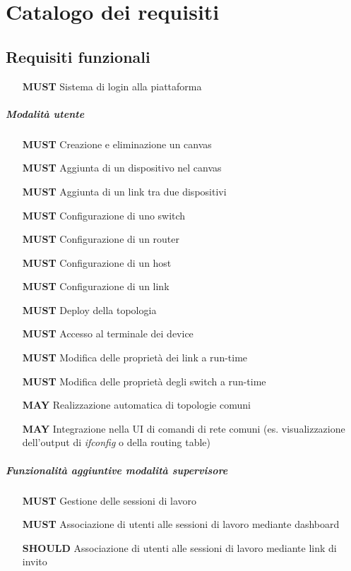 \documentclass[../main.tex]{subfiles}
\begin{document}
\chapter{Catalogo dei requisiti}
\section{Requisiti funzionali}

\begin{itemize}
    \item[\textbf{MUST}] Sistema di login alla piattaforma
\end{itemize}
\paragraph{Modalità utente}
\begin{itemize} 
    \setlength\itemsep{1em}
    \item[\textbf{MUST}] Creazione e eliminazione un canvas
    \item[\textbf{MUST}] Aggiunta di un dispositivo nel canvas
    \item[\textbf{MUST}] Aggiunta di un link tra due dispositivi
    \item[\textbf{MUST}] Configurazione di uno switch
    \item[\textbf{MUST}] Configurazione di un router
    \item[\textbf{MUST}] Configurazione di un host
    \item[\textbf{MUST}] Configurazione di un link
    \item[\textbf{MUST}] Deploy della topologia
    \item[\textbf{MUST}] Accesso al terminale dei device
    \item[\textbf{MUST}] Modifica delle proprietà dei link a run-time
    \item[\textbf{MUST}] Modifica delle proprietà degli switch a run-time
    \item[\textbf{MAY}] Realizzazione automatica di topologie comuni    
    \item[\textbf{MAY}] Integrazione nella UI di comandi di rete comuni (es. visualizzazione dell'output di \textit{ifconfig} o della routing table)
\end{itemize}
\paragraph{Funzionalità aggiuntive modalità supervisore}
\begin{itemize}
    \setlength\itemsep{1em}
    \item[\textbf{MUST}] Gestione delle sessioni di lavoro
    \item[\textbf{MUST}] Associazione di utenti alle sessioni di lavoro mediante dashboard
    \item[\textbf{SHOULD}] Associazione di utenti alle sessioni di lavoro mediante link di invito
\end{itemize}
\end{document}
